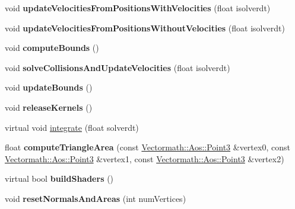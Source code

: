 \begin{DoxyCompactItemize}
void {\bfseries update\+Velocities\+From\+Positions\+With\+Velocities} (float isolverdt)
\item 
\mbox{\label{classbtDX11SoftBodySolver_a5c8e0ffc26b8f0091abd14112fb2b671}} 
void {\bfseries update\+Velocities\+From\+Positions\+Without\+Velocities} (float isolverdt)
\item 
\mbox{\label{classbtDX11SoftBodySolver_a256c52023e8affaac8f309376b92c5e5}} 
void {\bfseries compute\+Bounds} ()
\item 
\mbox{\label{classbtDX11SoftBodySolver_ad5e290cbde6331e1efe917ae2d8ebf34}} 
void {\bfseries solve\+Collisions\+And\+Update\+Velocities} (float isolverdt)
\item 
\mbox{\label{classbtDX11SoftBodySolver_a99d25abbd7214746d3f3bf2bb9d0be77}} 
void {\bfseries update\+Bounds} ()
\item 
\mbox{\label{classbtDX11SoftBodySolver_ab48ddcf852021890fad6875a140ecd24}} 
void {\bfseries release\+Kernels} ()
\item 
virtual void \hyperlink{classbtDX11SoftBodySolver_a7453302b8e92e309fabc922ce09967e1}{integrate} (float solverdt)
\item 
\mbox{\label{classbtDX11SoftBodySolver_ab9ced309389f25315b8e8a4a7bca2d32}} 
float {\bfseries compute\+Triangle\+Area} (const \hyperlink{classVectormath_1_1Aos_1_1Point3}{Vectormath\+::\+Aos\+::\+Point3} \&vertex0, const \hyperlink{classVectormath_1_1Aos_1_1Point3}{Vectormath\+::\+Aos\+::\+Point3} \&vertex1, const \hyperlink{classVectormath_1_1Aos_1_1Point3}{Vectormath\+::\+Aos\+::\+Point3} \&vertex2)
\item 
\mbox{\label{classbtDX11SoftBodySolver_a0455a053efff6f3cd8d44ea09e09a9c5}} 
virtual bool {\bfseries build\+Shaders} ()
\item 
\mbox{\label{classbtDX11SoftBodySolver_a58570c531d86cef2819fce83e58b143b}} 
void {\bfseries reset\+Normals\+And\+Areas} (int num\+Vertices)
\item 
\mbox{\label{classbtDX11SoftBodySolver_a53a44cfa955c8732830fb7f6ea883374}} 

\end{DoxyCompactItemize}
